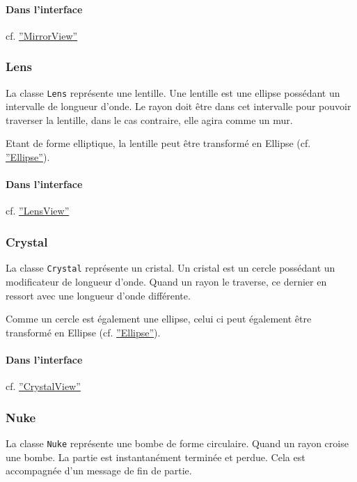 \documentclass[]{article}
\begin{document}
\paragraph{Dans l'interface} cf. \hyperref[MirrorView]{''MirrorView''}

\subsubsection{\label{Lens}Lens}

La classe \texttt{Lens} représente une lentille. Une lentille est
une ellipse possédant un intervalle de longueur d'onde. Le rayon doit
être dans cet intervalle pour pouvoir traverser la lentille, dans le cas
contraire, elle agira comme un mur.

Etant de forme elliptique, la lentille peut être transformé en Ellipse (cf. \hyperref[Ellipse]{''Ellipse''}).

\paragraph{Dans l'interface} cf. \hyperref[LensView]{''LensView''}

\newpage
\subsubsection{\label{Crystal}Crystal}

La classe \texttt{Crystal} représente un cristal. Un cristal est un cercle
possédant un modificateur de longueur d'onde. Quand un rayon le traverse, ce dernier
en ressort avec une longueur d'onde différente. 

Comme un cercle est également une ellipse, celui ci peut également être transformé en Ellipse (cf. \hyperref[Ellipse]{''Ellipse''}).

\paragraph{Dans l'interface} cf. \hyperref[CrystalView]{''CrystalView''}

\subsubsection{\label{Nuke}Nuke}

La classe \texttt{Nuke} représente une bombe de forme circulaire.
Quand un rayon croise une bombe. La partie est instantanément terminée et perdue. Cela est accompagnée
d'un message de fin de partie.
\end{document}
